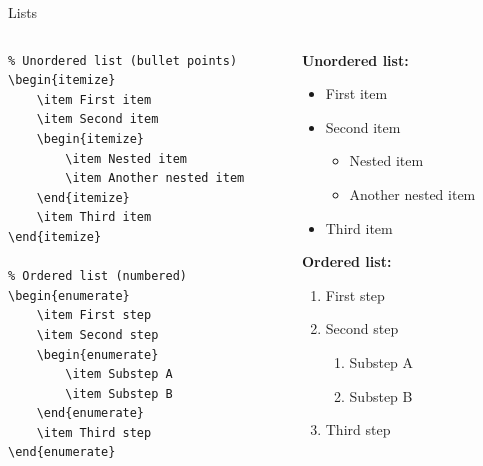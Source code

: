 \begin{frame}[fragile]{Lists}
    \begin{columns}
        \begin{column}{0.5\textwidth}
\begin{lstlisting}
% Unordered list (bullet points)
\begin{itemize}
    \item First item
    \item Second item
    \begin{itemize}
        \item Nested item
        \item Another nested item
    \end{itemize}
    \item Third item
\end{itemize}

% Ordered list (numbered)
\begin{enumerate}
    \item First step
    \item Second step
    \begin{enumerate}
        \item Substep A
        \item Substep B
    \end{enumerate}
    \item Third step
\end{enumerate}
\end{lstlisting}
        \end{column}
        
        \begin{column}{0.5\textwidth}
            \textbf{Unordered list:}
            \begin{itemize}
                \item First item
                \item Second item
                \begin{itemize}
                    \item Nested item
                    \item Another nested item
                \end{itemize}
                \item Third item
            \end{itemize}
            
            \textbf{Ordered list:}
            \begin{enumerate}
                \item First step
                \item Second step
                \begin{enumerate}
                    \item Substep A
                    \item Substep B
                \end{enumerate}
                \item Third step
            \end{enumerate}
        \end{column}
    \end{columns}
\end{frame}

